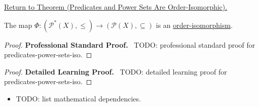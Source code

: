 \newpage
{}
\label{prf:predicates-power-sets-iso}

\begin{remark*}[Return]
\hyperref[prop:predicates-power-sets-iso]{Return to Theorem (Predicates and Power Sets Are Order-Isomorphic).}
\end{remark*}

\begin{theorem*}
The map $\Phi : (\mathcal{P}^*(X), \leq) \to (\mathcal{P}(X), \subseteq)$
is an \hyperref[def:order-isomorphism]{order-isomorphism}.
\end{theorem*}

\begin{proof}
\textbf{Professional Standard Proof.}~
TODO: professional standard proof for predicates-power-sets-iso.
\end{proof}

\begin{proof}
\textbf{Detailed Learning Proof.}~
TODO: detailed learning proof for predicates-power-sets-iso.
\end{proof}

\begin{remark*}
\end{remark*}

\begin{dependencies}
\begin{itemize}
  \item TODO: list mathematical dependencies.
\end{itemize}
\end{dependencies}

\clearpage
